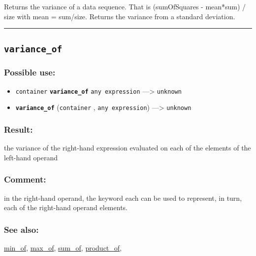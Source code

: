 \documentclass[]{book}
\providecommand{\tightlist}{%
  \setlength{\itemsep}{0pt}\setlength{\parskip}{0pt}}
\theoremstyle{definition}
\theoremstyle{definition}
\theoremstyle{definition}
\theoremstyle{remark}
\begin{document}
Returns the variance of a data sequence. That is (sumOfSquares -
mean*sum) / size with mean = sum/size. Returns the variance from a
standard deviation.

\begin{center}\rule{0.5\linewidth}{\linethickness}\end{center}

\subsection{\texorpdfstring{\texttt{variance\_of}}{variance\_of}}\label{variance_of}

\subsubsection{Possible use:}\label{possible-use-550}

\begin{itemize}
\tightlist
\item
  \texttt{container} \textbf{\texttt{variance\_of}}
  \texttt{any\ expression} ---\textgreater{} \texttt{unknown}
\item
  \textbf{\texttt{variance\_of}} (\texttt{container} ,
  \texttt{any\ expression}) ---\textgreater{} \texttt{unknown}
\end{itemize}

\subsubsection{Result:}\label{result-530}

the variance of the right-hand expression evaluated on each of the
elements of the left-hand operand

\subsubsection{Comment:}\label{comment-106}

in the right-hand operand, the keyword each can be used to represent, in
turn, each of the right-hand operand elements.

\subsubsection{See also:}\label{see-also-218}

\href{OperatorsIM\#min_of}{min\_of},
\href{OperatorsIM\#max_of}{max\_of},
\href{OperatorsSZ\#sum_of}{sum\_of},
\href{OperatorsNR\#product_of}{product\_of},
\end{document}
